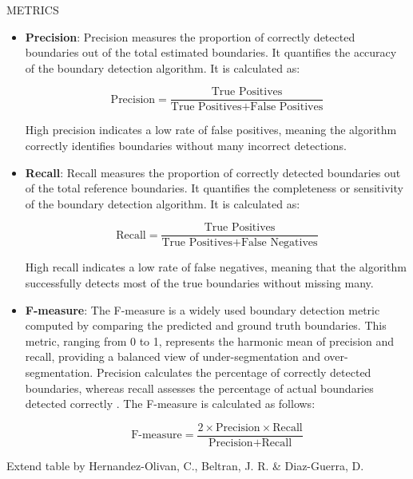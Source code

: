 
METRICS

\begin{itemize}
    \item \textbf{Precision}: Precision measures the proportion of correctly detected boundaries out of the total estimated boundaries. It quantifies the accuracy of the boundary detection algorithm. It is calculated as:
    
    \[
    \text{Precision} = \frac{\text{True Positives}}{\text{True Positives} + \text{False Positives}}
    \]
    
    High precision indicates a low rate of false positives, meaning the algorithm correctly identifies boundaries without many incorrect detections.
    
    \item \textbf{Recall}: Recall measures the proportion of correctly detected boundaries out of the total reference boundaries. It quantifies the completeness or sensitivity of the boundary detection algorithm. It is calculated as:
    
    \[
    \text{Recall} = \frac{\text{True Positives}}{\text{True Positives} + \text{False Negatives}}
    \]
    
    High recall indicates a low rate of false negatives, meaning that the algorithm successfully detects most of the true boundaries without missing many.
    
    \item \textbf{F-measure}: The F-measure is a widely used boundary detection metric computed by comparing the predicted and ground truth boundaries. This metric, ranging from 0 to 1, represents the harmonic mean of precision and recall, providing a balanced view of under-segmentation and over-segmentation. Precision calculates the percentage of correctly detected boundaries, whereas recall assesses the percentage of actual boundaries detected correctly \cite{Turnbull2007ABOOSTING}. The F-measure is calculated as follows:
    
    \[
    \text{F-measure} = \frac{2 \times \text{Precision} \times \text{Recall}}{\text{Precision} + \text{Recall}}
    \]
\end{itemize}

Extend table by Hernandez-Olivan, C., Beltran, J. R. \& Diaz-Guerra, D. 
\cite{Hernandez-Olivan2021MusicFeatures}

